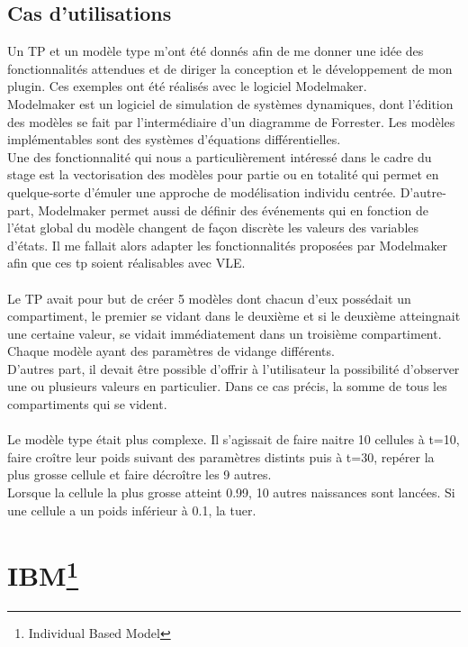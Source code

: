 \subsection{Cas d'utilisations}
Un TP et un modèle type m'ont été donnés afin de me donner une idée des fonctionnalités attendues et de diriger la conception et le développement de mon plugin. Ces exemples ont été réalisés avec le logiciel Modelmaker.\\
Modelmaker est un logiciel de simulation de systèmes dynamiques, dont l'édition des modèles se fait par l'intermédiaire d'un diagramme de Forrester. Les modèles implémentables sont des systèmes d'équations différentielles.\\
Une des fonctionnalité qui nous a particulièrement intéressé dans le cadre du stage est la vectorisation des modèles pour partie ou en totalité qui permet en quelque-sorte d'émuler une approche de modélisation individu centrée. D'autre-part, Modelmaker permet aussi de définir des événements qui en fonction de l'état global du modèle changent de façon discrète les valeurs des variables d'états. Il me fallait alors adapter les fonctionnalités proposées par Modelmaker afin que ces tp soient réalisables avec VLE.\\
\\
Le TP avait pour but de créer 5 modèles dont chacun d'eux possédait un compartiment, le premier se vidant dans le deuxième et si le deuxième atteingnait une certaine valeur, se vidait immédiatement dans un troisième compartiment. Chaque modèle ayant des paramètres de vidange différents.\\
D'autres part, il devait être possible d'offrir à l'utilisateur la possibilité d'observer une ou plusieurs valeurs en particulier. Dans ce cas précis, la somme de tous les compartiments qui se vident.\\
\\
Le modèle type était plus complexe. Il s'agissait de faire naitre 10 cellules à t=10, faire croître leur poids suivant des paramètres distints puis à t=30, repérer la plus grosse cellule et faire décroître les 9 autres.\\ Lorsque la cellule la plus grosse atteint 0.99, 10 autres naissances sont lancées. Si une cellule a un poids inférieur à 0.1, la tuer.
 
\section[IBM] {IBM\footnote{Individual Based Model}}
